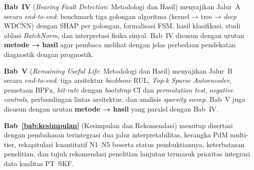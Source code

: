 \textbf{Bab~IV} (\emph{Bearing Fault Detection}: Metodologi dan
Hasil) menyajikan Jalur~A secara \emph{end-to-end}: benchmark tiga
golongan algoritma (kernel → tree → \emph{deep} WDCNN) dengan SHAP
per golongan, formalisasi FSM, hasil klasifikasi, studi ablasi
\emph{BatchNorm}, dan interpretasi fisika sinyal.
Bab~IV disusun dengan urutan \textbf{metode → hasil} agar pembaca
melihat dengan jelas perbedaan pendekatan diagnostik dengan prognostik.

\textbf{Bab~V} (\emph{Remaining Useful Life}: Metodologi dan Hasil)
menyajikan Jalur~B secara \emph{end-to-end}: tiga arsitektur
\emph{backbone} RUL, \emph{Top-k Sparse Autoencoder}, pemetaan BPFx,
\emph{hit-rate} dengan \emph{bootstrap} CI dan \emph{permutation
test}, \emph{negative controls}, perbandingan lintas arsitektur, dan
analisis \emph{sparsity sweep}.
Bab~V juga disusun dengan urutan \textbf{metode → hasil} yang
paralel dengan Bab~IV.

\textbf{Bab~\ref{bab:kesimpulan}} (Kesimpulan dan Rekomendasi)
menutup disertasi dengan pembahasan terintegrasi dua jalur
interpretabilitas, kerangka PdM multi-tier, rekapitulasi kuantitatif
N1–N5 beserta status pembuktiannya, keterbatasan penelitian, dan
tujuh rekomendasi penelitian lanjutan termasuk prioritas integrasi
data kualitas PT~SKF.
